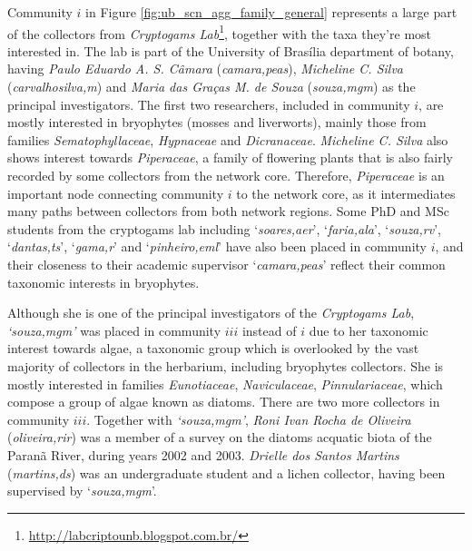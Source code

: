 Community $i$ in Figure \ref{fig:ub_scn_agg_family_general} represents a large part of the collectors from \textit{Cryptogams Lab}\footnote{\url{http://labcriptounb.blogspot.com.br/}}, together with the taxa they're most interested in. 
The lab is part of the University of Brasília department of botany, having \textit{Paulo Eduardo A. S. Câmara} (\textit{camara,peas}), \textit{Micheline C. Silva} (\textit{carvalhosilva,m}) and \textit{Maria das Graças M. de Souza} (\textit{souza,mgm}) as the principal investigators. 
%
The first two researchers, included in community $i$, are mostly interested in bryophytes (mosses and liverworts), mainly those from families \textit{Sematophyllaceae}, \textit{Hypnaceae} and \textit{Dicranaceae}.
\textit{Micheline C. Silva} also shows interest towards \textit{Piperaceae}, a family of flowering plants that is also fairly recorded by some collectors from the network core. 
Therefore, \textit{Piperaceae} is an important node connecting community $i$ to the network core, as it intermediates many paths between collectors from both network regions.
%
Some PhD and MSc students from the cryptogams lab including `\textit{soares,aer}', `\textit{faria,ala}', `\textit{souza,rv}', `\textit{dantas,ts}', `\textit{gama,r}' and `\textit{pinheiro,eml}' have also been placed in community $i$, and their closeness to their academic supervisor `\textit{camara,peas}' reflect their common taxonomic interests in bryophytes.

Although she is one of the principal investigators of the \textit{Cryptogams Lab}, \textit{`souza,mgm'} was placed in community $iii$ instead of $i$ due to her taxonomic interest towards algae, a taxonomic group which is overlooked by the vast majority of collectors in the herbarium, including bryophytes collectors. 
She is mostly interested in families \textit{Eunotiaceae}, \textit{Naviculaceae}, \textit{Pinnulariaceae}, which compose a group of algae known as diatoms.
There are two more collectors in community $iii$.
Together with \textit{`souza,mgm'}, \textit{Roni Ivan Rocha de Oliveira} (\textit{oliveira,rir}) was a member of a survey on the diatoms acquatic biota of the Paranã River, during years 2002 and 2003.
\textit{Drielle dos Santos Martins} (\textit{martins,ds}) was an undergraduate student and a lichen collector, having been supervised by `\textit{souza,mgm}'.

